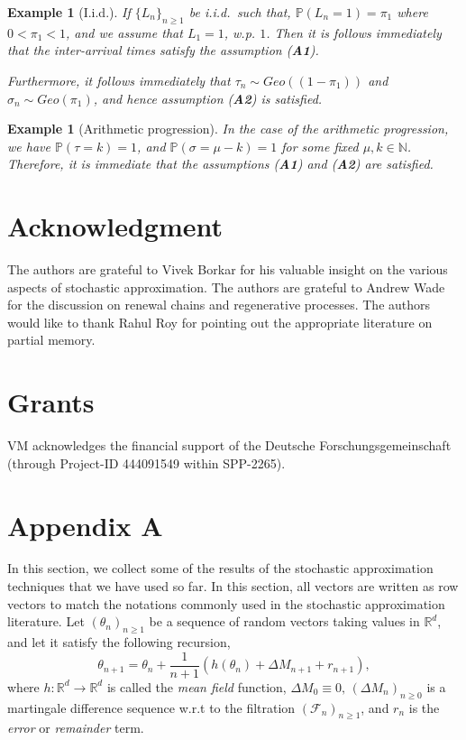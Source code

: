 \documentclass{article}
\numberwithin{equation}{section}
\newtheorem{example}[theorem]{Example}
\newcommand{\FF}{\mbox{${\mathcal F}$}}
\newcommand{\Rbold}{\mbox{${\mathbb R}$}}
\newcommand{\bN}{\mbox{${\mathbb N}$}}
\newcommand{\1}{\mathbf{1}}
\newcommand{\0}{\mathbf{0}}
\newcommand{\PP}{\mbox{${\mathbb P}$}}
\begin{document}
\begin{example}[I.i.d.] If $\{L_n\}_{n \ge 1}$ be i.i.d.\, such that, $\PP(L_n=1)=\pi_1$ where $0 < \pi_1 <1$, and we assume that $L_1 =1$, w.p. $1$. Then it is follows immediately that the inter-arrival times satisfy the assumption (\textbf{A1}).

Furthermore, it follows immediately that $\tau_n \sim Geo((1-\pi_1))$ and $\sigma_n \sim Geo(\pi_1)$, and hence assumption (\textbf{A2}) is satisfied.
\end{example}
\begin{example}[Arithmetic progression]
In the case of the arithmetic progression, we have $\PP(\tau=k)=1$, and
$\PP(\sigma=\mu-k)=1$ for some fixed $\mu, k \in \bN$. Therefore, it is immediate that the assumptions (\textbf{A1}) and (\textbf{A2}) are satisfied.
\end{example}



\section*{Acknowledgment}
The authors are grateful to Vivek Borkar for his valuable insight on the various aspects of stochastic approximation. The authors are grateful to Andrew Wade for the discussion on renewal chains and regenerative processes. The authors would like to thank Rahul Roy for pointing out the appropriate literature on partial memory.

\section*{Grants}
VM acknowledges the financial support of the Deutsche Forschungsgemeinschaft (through Project-ID 444091549 within SPP-2265).






\section*{Appendix A}

In this section, we collect some of the results of the stochastic approximation techniques that we have used so far. In this section, all vectors are written as row vectors to match the notations commonly used in the stochastic approximation literature.
Let $(\theta_n)_{n \ge 1}$ be a sequence of random vectors taking values in $\Rbold^d$, and let it satisfy the following recursion,
\begin{equation}
\label{Eq: recursion_general_SA}
\theta_{n+1}=\theta_{n}+\frac{1}{n+1}\left(h(\theta_n)+ \Delta M_{n+1}+ r_{n+1}\right),
\end{equation}
where $h:\Rbold^d \longrightarrow \Rbold^d$ is called the \textit{mean field} function, $\Delta M_0\equiv 0, \, \left(\Delta M_n\right)_{n \ge0}$ is a martingale difference sequence w.r.t to the filtration $(\FF_n)_{n \ge 1}$, and $r_n$ is the \textit{error} or \textit{remainder} term.
\end{document}
